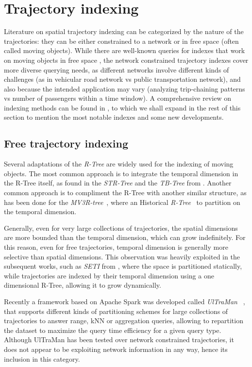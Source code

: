 \documentclass[a4paper,10pt,twoside]{book}
\begin{document}
	\section{Trajectory indexing}
	\label{sec:ti}
	Literature on spatial trajectory indexing can be categorized by the nature of the trajectories: they can be either constrained to a network or in free space (often called moving objects). While there are well-known queries for indexes that work on moving objects in free space \cite{DBLP:conf/vldb/PfoserJT00}, the network constrained trajectory indexes cover more diverse querying needs, as different networks involve different kinds of challenges (as in vehicular road network vs public transportation network), and also because the intended application may vary (analyzing trip-chaining patterns vs number of passengers within a time window). A comprehensive review on indexing methods can be found in \cite[Chapter 4]{DBLP:books/sp/PelekisT14}, to which we shall expand in the rest of this section to mention the most notable indexes and some new developments.
	
	\subsection{Free trajectory indexing}
	Several adaptations of the {\em R-Tree} \cite{DBLP:conf/sigmod/Guttman84} are widely used for the indexing of moving objects. The most common approach is to integrate the temporal dimension in the R-Tree itself, as found in the {\em STR-Tree} and the {\em TB-Tree} from \cite{DBLP:conf/vldb/PfoserJT00}.
    Another common approach is to compliment the R-Tree with another similar structure, as has been done for the {\em MV3R-tree}~\cite{DBLP:conf/vldb/PapadiasT01},
    where an Historical {\em R-Tree}~\cite{nascimento1998towards} to partition on the temporal dimension.
    
    Generally, even for very large collections of trajectories, the spatial dimensions are more bounded than the temporal dimension, which can grow indefinitely. For this reason, even for free trajectories, temporal dimension is generally more selective than spatial dimensions. This observation was heavily exploited in the subsequent works, such as {\em SETI} from \cite{chakka2003indexing}, where the space is partitioned statically, while trajectories are indexed by their temporal dimension using a one dimensional R-Tree, allowing it to grow dynamically.
    
    Recently a framework based on Apache Spark was developed called {\em UlTraMan}~ \cite{ding2018ultraman}, that supports different kinds of partitioning schemes for large collections of trajectories to answer range, kNN or aggregation queries, allowing to repartition the dataset to maximize the query time efficiency for a given query type. Although UlTraMan has been tested over network constrained trajectories, it does not appear to be exploiting network information in any way, hence its inclusion in this category.
    
\end{document}
